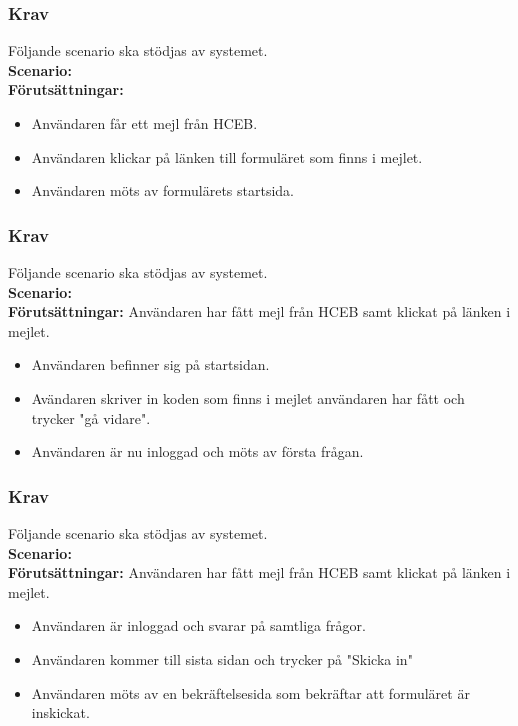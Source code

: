 \documentclass{article}
\begin{document}
        \subsubsection{Krav}
    Följande scenario ska stödjas av systemet.
        \\
       \indent \textbf{Scenario:}
        \\
       \indent \textbf{Förutsättningar:}
            \begin{itemize}
                \item  Användaren får ett mejl från HCEB.
                \item Användaren klickar på länken till formuläret som finns i mejlet.
                \item Användaren möts av formulärets startsida.
            \end{itemize}
            
        \subsubsection{Krav}
    Följande scenario ska stödjas av systemet.
        \\
       \indent \textbf{Scenario:}
        \\
       \indent \textbf{Förutsättningar:}
       Användaren har fått mejl från HCEB samt klickat på länken i mejlet.
            \begin{itemize}
                \item   Användaren befinner sig på startsidan.
                \item Avändaren skriver in koden som finns i mejlet användaren har fått och trycker "gå vidare".
                \item  Användaren är nu inloggad och möts av första frågan.
            \end{itemize}
        \subsubsection{Krav}
    Följande scenario ska stödjas av systemet.
        \\
       \indent \textbf{Scenario:}
        \\
       \indent \textbf{Förutsättningar:}
       Användaren har fått mejl från HCEB samt klickat på länken i mejlet.
            \begin{itemize}
                \item   Användaren är inloggad och svarar på samtliga frågor.
                \item Användaren kommer till sista sidan och trycker på "Skicka in"
                \item   Användaren möts av en bekräftelsesida som bekräftar att formuläret är inskickat.
            \end{itemize}
\end{document}
